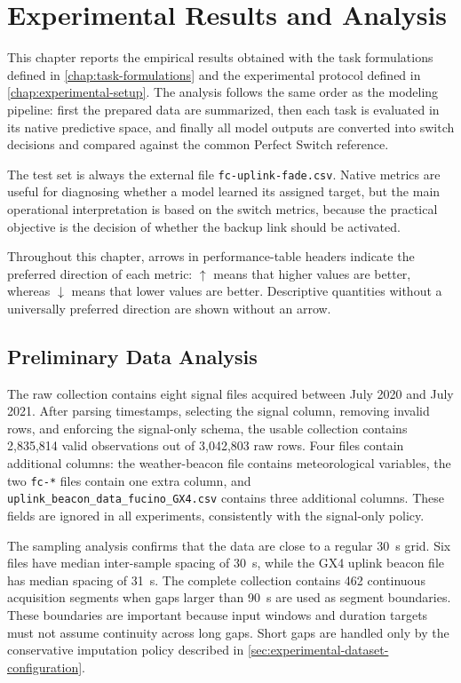 \chapter{Experimental Results and Analysis}
\label{chap:results}

This chapter reports the empirical results obtained with the task formulations
defined in \cref{chap:task-formulations} and the experimental protocol defined
in \cref{chap:experimental-setup}. The analysis follows the same order as the
modeling pipeline: first the prepared data are summarized, then each task is
evaluated in its native predictive space, and finally all model outputs are
converted into switch decisions and compared against the common Perfect Switch
reference.

The test set is always the external file \texttt{fc-uplink-fade.csv}. Native
metrics are useful for diagnosing whether a model learned its assigned target,
but the main operational interpretation is based on the switch metrics, because
the practical objective is the decision of whether the backup link should be
activated.

Throughout this chapter, arrows in performance-table headers indicate the
preferred direction of each metric: \(\uparrow\) means that higher values are
better, whereas \(\downarrow\) means that lower values are better. Descriptive
quantities without a universally preferred direction are shown without an
arrow.

\section{Preliminary Data Analysis}
\label{sec:results-preliminary-data-analysis}

The raw collection contains eight signal files acquired between July 2020 and
July 2021. After parsing timestamps, selecting the signal column, removing
invalid rows, and enforcing the signal-only schema, the usable collection
contains 2,835,814 valid observations out of 3,042,803 raw rows. Four files
contain additional columns: the weather-beacon file contains meteorological
variables, the two \texttt{fc-*} files contain one extra column, and
\texttt{uplink\_beacon\_data\_fucino\_GX4.csv} contains three additional
columns. These fields are ignored in all experiments, consistently with the
signal-only policy.

The sampling analysis confirms that the data are close to a regular
\SI{30}{s} grid. Six files have median inter-sample spacing of \SI{30}{s}, while
the GX4 uplink beacon file has median spacing of \SI{31}{s}. The complete
collection contains 462 continuous acquisition
segments when gaps larger than \SI{90}{s} are used as segment boundaries. These
boundaries are important because input windows and duration targets must not
assume continuity across long gaps. Short gaps are handled only by the
conservative imputation policy described in
\cref{sec:experimental-dataset-configuration}.

